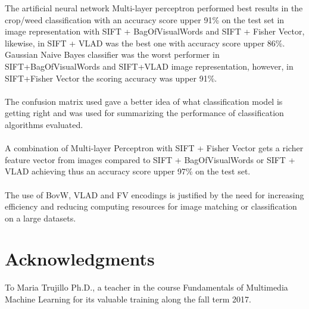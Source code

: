 \documentclass[12pt]{article}
\numberwithin{equation}{section}
\numberwithin{table}{section}
\numberwithin{figure}{section}
\begin{document}
The artificial neural network Multi-layer perceptron performed best results in the crop/weed classification with an accuracy score upper 91\% on the test set in image representation with SIFT + BagOfVisualWords and SIFT + Fisher Vector, likewise, in SIFT + VLAD  was the best one with accuracy score upper 86\%. Gaussian Naive Bayes classifier was the worst performer in SIFT+BagOfVisualWords and SIFT+VLAD image representation, however, in SIFT+Fisher Vector the scoring accuracy was upper 91\%.\\\\
\noindent
The confusion matrix used gave a better idea of what classification model is getting right and was used for summarizing the performance of classification algorithms evaluated. \\\\
\noindent
A combination of Multi-layer Perceptron with SIFT + Fisher Vector gets a richer feature vector from images compared to SIFT + BagOfVisualWords  or  SIFT + VLAD achieving thus an accuracy score upper 97\% on the test set.\\\\
\noindent
The use of BovW, VLAD and FV encodings is justified by the need for increasing efficiency and reducing
computing resources for image matching or classification on a large datasets.

\section*{Acknowledgments}

To Maria Trujillo Ph.D., a teacher in the course Fundamentals of Multimedia Machine Learning for its valuable training along the fall term 2017.
 



\end{document}
